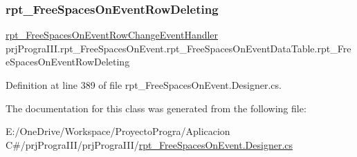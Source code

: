 \hypertarget{classprj_progra_i_i_i_1_1rpt___free_spaces_on_event_1_1rpt___free_spaces_on_event_data_table_a8b5d9adc84f252e2b71c14a57c5e65c3}{}\label{classprj_progra_i_i_i_1_1rpt___free_spaces_on_event_1_1rpt___free_spaces_on_event_data_table_a8b5d9adc84f252e2b71c14a57c5e65c3} 
\subsubsection{\texorpdfstring{rpt\+\_\+\+Free\+Spaces\+On\+Event\+Row\+Deleting}{rpt\_FreeSpacesOnEventRowDeleting}}
{\footnotesize\ttfamily \hyperlink{classprj_progra_i_i_i_1_1rpt___free_spaces_on_event_a19ccb59e3a6fc2f077280510cfdf1d21}{rpt\+\_\+\+Free\+Spaces\+On\+Event\+Row\+Change\+Event\+Handler} prj\+Progra\+I\+I\+I.\+rpt\+\_\+\+Free\+Spaces\+On\+Event.\+rpt\+\_\+\+Free\+Spaces\+On\+Event\+Data\+Table.\+rpt\+\_\+\+Free\+Spaces\+On\+Event\+Row\+Deleting}



Definition at line 389 of file rpt\+\_\+\+Free\+Spaces\+On\+Event.\+Designer.\+cs.



The documentation for this class was generated from the following file\+:\begin{DoxyCompactItemize}
\item 
E\+:/\+One\+Drive/\+Workspace/\+Proyecto\+Progra/\+Aplicacion C\#/prj\+Progra\+I\+I\+I/prj\+Progra\+I\+I\+I/\hyperlink{rpt___free_spaces_on_event_8_designer_8cs}{rpt\+\_\+\+Free\+Spaces\+On\+Event.\+Designer.\+cs}\end{DoxyCompactItemize}
